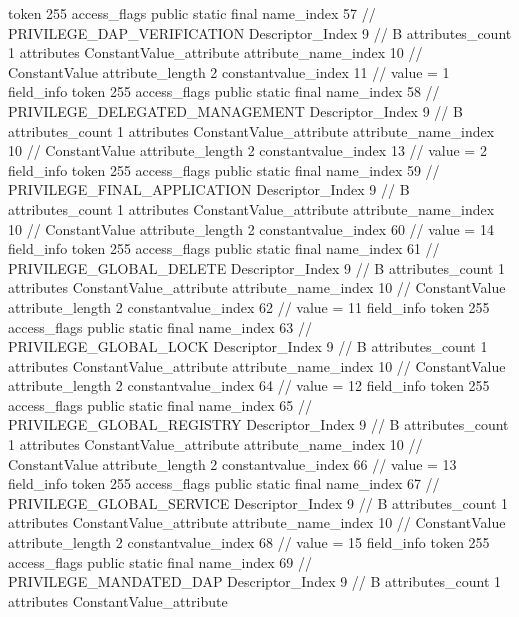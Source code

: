 {{{{{				token	255
				access_flags	public static final
				name_index	57		// PRIVILEGE_DAP_VERIFICATION
				Descriptor_Index	9		// B
				attributes_count	1
				attributes {
				ConstantValue_attribute {
					attribute_name_index	10		// ConstantValue
					attribute_length	2
					constantvalue_index	11		// value = 1
				}
				}
			}
			field_info {
				token	255
				access_flags	public static final
				name_index	58		// PRIVILEGE_DELEGATED_MANAGEMENT
				Descriptor_Index	9		// B
				attributes_count	1
				attributes {
				ConstantValue_attribute {
					attribute_name_index	10		// ConstantValue
					attribute_length	2
					constantvalue_index	13		// value = 2
				}
				}
			}
			field_info {
				token	255
				access_flags	public static final
				name_index	59		// PRIVILEGE_FINAL_APPLICATION
				Descriptor_Index	9		// B
				attributes_count	1
				attributes {
				ConstantValue_attribute {
					attribute_name_index	10		// ConstantValue
					attribute_length	2
					constantvalue_index	60		// value = 14
				}
				}
			}
			field_info {
				token	255
				access_flags	public static final
				name_index	61		// PRIVILEGE_GLOBAL_DELETE
				Descriptor_Index	9		// B
				attributes_count	1
				attributes {
				ConstantValue_attribute {
					attribute_name_index	10		// ConstantValue
					attribute_length	2
					constantvalue_index	62		// value = 11
				}
				}
			}
			field_info {
				token	255
				access_flags	public static final
				name_index	63		// PRIVILEGE_GLOBAL_LOCK
				Descriptor_Index	9		// B
				attributes_count	1
				attributes {
				ConstantValue_attribute {
					attribute_name_index	10		// ConstantValue
					attribute_length	2
					constantvalue_index	64		// value = 12
				}
				}
			}
			field_info {
				token	255
				access_flags	public static final
				name_index	65		// PRIVILEGE_GLOBAL_REGISTRY
				Descriptor_Index	9		// B
				attributes_count	1
				attributes {
				ConstantValue_attribute {
					attribute_name_index	10		// ConstantValue
					attribute_length	2
					constantvalue_index	66		// value = 13
				}
				}
			}
			field_info {
				token	255
				access_flags	public static final
				name_index	67		// PRIVILEGE_GLOBAL_SERVICE
				Descriptor_Index	9		// B
				attributes_count	1
				attributes {
				ConstantValue_attribute {
					attribute_name_index	10		// ConstantValue
					attribute_length	2
					constantvalue_index	68		// value = 15
				}
				}
			}
			field_info {
				token	255
				access_flags	public static final
				name_index	69		// PRIVILEGE_MANDATED_DAP
				Descriptor_Index	9		// B
				attributes_count	1
				attributes {
				ConstantValue_attribute {
}}}}}}}
